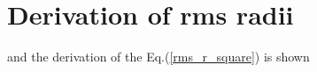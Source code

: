 
\chapter{Derivation of rms radii} %
\label{Appendix_RMS} 
and the derivation of the Eq.(\ref{rms_r_square}) is shown
